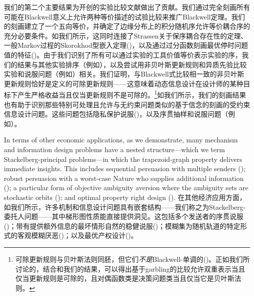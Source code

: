 \documentclass[12pt,letterpaper]{article}
\newenvironment{original}{\color{black}}{}
\newenvironment{translation}{\color{blue}}{}
\theoremstyle{plain}
\theoremstyle{definition}
\theoremstyle{remark}
\theoremstyle{definition}
\begin{document}
\begin{translation}
我们的第二个主要结果为\citet{Blackwell1951Comparison}开创的实验比较文献做出了贡献。我们通过完全刻画所有可能在Blackwell意义上允许两种等价描述的试验比较来推广Blackwell定理。我们的刻画建立了一个五向等价，并确定了边缘分布上的积分随机序允许等价耦合序的充分必要条件。如我们所示，这同时连接了Strassen关于保序耦合存在性的定理、一般Markov过程的Skorokhod型嵌入定理(\citealt{rost1971stopping})，以及通过过分函数刻画最优停时问题值的特征(\citealt{dynkin1963optimal})。由于我们识别了所有可以通过实验的工具价值等价表示实验的序，我们的结果与其他实验排序（例如\citealt[][]{Lehmann,chen2025experiments}），以及尝试用非贝叶斯更新规则和异质先验比较实验和说服问题（例如\citealt[][]{alonso2016bayesian,de2022non,kobayashi2025dynamic,azrieli2025sequential}）相关。我们证明，与Blackwell式比较相一致的非贝叶斯更新规则恰好是\citet{cripps2018divisible}定义的可除更新规则——这意味着动态信息设计在设计师的某种目标下产生严格收益当且仅当更新规则不是可除的。\footnote{可除更新规则与贝叶斯法则同胚，但它们\textit{不是}Blackwell-单调的(\citealt{whitmeyerforthcomingBlackwell})。正如我们所讨论的，结合\citet{whitmeyerforthcomingBlackwell}和我们的结果，可以得出基于garbling的比较允许双重表示当且仅当更新规则是可除的，且对偶函数类是决策问题类当且仅当它是贝叶斯法则。}如我们所示，我们的刻画结果也有助于识别那些特别可处理且允许与无约束问题类似的基于信念的刻画的受约束信息设计问题。这些问题包括隐私保护说服(\citealt*{strack2024privacy,he2024private})，以及序贯抽样和说服问题（例如\citealt*[][]{Wald,henry2019research,morris2019wald,ball2021experimental,ni2023sequential}）。
\end{translation}

\begin{original}
In terms of other economic applications, as we demonstrate, many mechanism and information design problems have a nested structure---which we term Stackelberg-principal problems---in which the trapezoid-graph property delivers immediate insights. This includes sequential persuasion with multiple senders (\citealt{LiNorman2021SequentialPersuasion}); robust persuasion with a worst-case Nature who supplies additional information (\citealt{DworczakPavan2022RobustPersuasion}); a particular form of objective ambiguity aversion where the ambiguity sets are stochastic orbits (\citealt{olszewski2007preferences,Ahn2008AmbiguityWithoutStateSpace}); and optimal property right design (\citealt{DworczakMuir2024}).
\end{original}
\begin{translation}
在其他经济应用方面，如我们所示，许多机制和信息设计问题具有嵌套结构——我们称之为Stackelberg-委托人问题——其中梯形图性质能直接提供洞见。这包括多个发送者的序贯说服(\citealt{LiNorman2021SequentialPersuasion})；带有提供额外信息的最坏情形自然的稳健说服(\citealt{DworczakPavan2022RobustPersuasion})；模糊集为随机轨道的特定形式的客观模糊厌恶(\citealt{olszewski2007preferences,Ahn2008AmbiguityWithoutStateSpace})；以及最优产权设计(\citealt{DworczakMuir2024})。
\end{translation}
\end{document}
